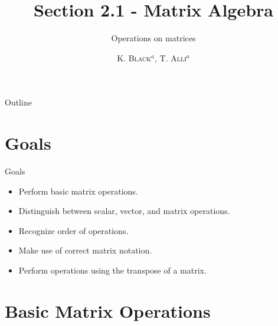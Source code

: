 \documentclass[svgnames,table,,aspectratio=169]{beamer}
\begin{document}
\author{\textsc{K. Black$^{a}$, T. Alli$^{a}$}}
\subject{Linear Algebra}


\title{Section 2.1 - Matrix Algebra}
\subtitle{Operations on matrices}

\date{} %

\begin{frame}
  \titlepage
\end{frame}

\begin{frame}{Outline}
  \tableofcontents
\end{frame}


\section{Goals}

\begin{frame}{Goals}

  \begin{itemize}
  \item Perform basic matrix operations.
  \item Distinguish between scalar, vector, and matrix operations.
  \item Recognize order of operations.
  \item Make use of correct matrix notation.
  \item Perform operations using the transpose of a matrix.
  \end{itemize}

\end{frame}

\section{Basic Matrix Operations}
\end{document}
